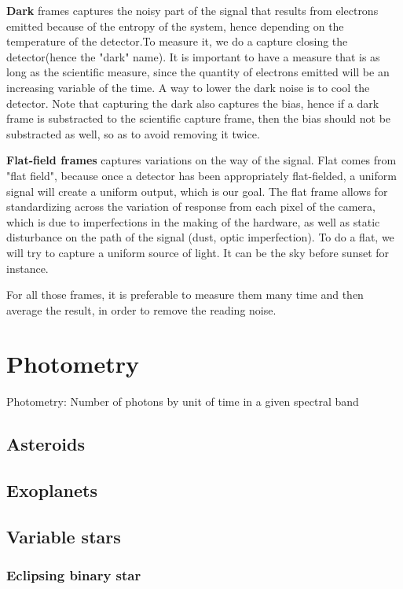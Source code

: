 \documentclass[a4paper]{report}
\begin{document}
\textbf{Dark} frames captures the noisy part of the signal that results from electrons emitted because of the entropy of the system, hence depending on the temperature of the detector.To measure it, we do a capture closing the detector(hence the "dark" name). It is important to have a measure that is as long as the scientific measure, since the quantity of electrons emitted will be an increasing variable of the time. A way to lower the dark noise is to cool the detector.
Note that capturing the dark also captures the bias, hence if a dark frame is substracted to the scientific capture frame, then the bias should not be substracted as well, so as to avoid removing it twice.


\textbf{Flat-field frames} captures variations on the way of the signal. Flat comes from "flat field", because once a detector has been appropriately flat-fielded, a uniform signal will create a uniform output, which is our goal. The flat frame allows for standardizing across the variation of response from each pixel of the camera, which is due to imperfections in the making of the hardware, as well as static disturbance on the path of the signal (dust, optic imperfection). To do a flat, we will try to capture a uniform source of light. It can be the sky before sunset for instance.


For all those frames, it is preferable to measure them many time and then average the result, in order to remove the reading noise. 



\section{Photometry}
Photometry: Number of photons by unit of time in a given spectral band


\subsection{Asteroids}

\subsection{Exoplanets}

\subsection{Variable stars}
\subsubsection{Eclipsing binary star}
\end{document}
